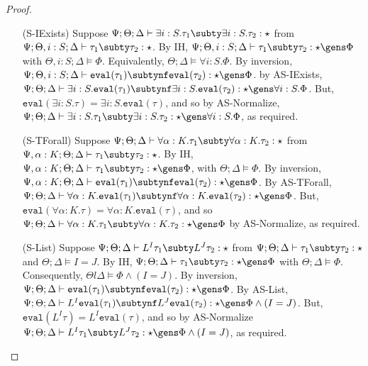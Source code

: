 \begin{proof}
\begin{itemize}
   \item[(S-IExists)] Suppose $\Psi ; \Theta ; \Delta \vdash \exists i : S. \tau_1 \subty \exists i : S. \tau_2 : \star$ from $\Psi ; \Theta, i : S ; \Delta \vdash \tau_1 \subty \tau_2 : \star$. By IH, $\Psi ; \Theta, i : S ; \Delta \vdash \tau_1 \subty \tau_2 : \star \gens \Phi$ with $\Theta, i : S ; \Delta \vDash \Phi$. Equivalently, $\Theta ; \Delta \vDash \forall i : S. \Phi$. By inversion, $\Psi ; \Theta, i : S ; \Delta \vdash \texttt{eval}(\tau_1) \subtynf \texttt{eval}(\tau_2) : \star \gens \Phi$. by AS-IExists, $\Psi ; \Theta ; \Delta \vdash \exists i : S. \texttt{eval}(\tau_1) \subtynf \exists i : S. \texttt{eval}(\tau_2) : \star \gens \forall i : S. \Phi$. But, $\texttt{eval}(\exists i : S. \tau) = \exists i : S.\texttt{eval}(\tau)$, and so by AS-Normalize, $\Psi ; \Theta ; \Delta \vdash \exists i : S. \tau_1 \subty \exists i : S. \tau_2 : \star \gens \forall i : S. \Phi$, as required.
   \item[(S-TForall)] Suppose $\Psi ; \Theta ; \Delta \vdash \forall \alpha : K. \tau_1 \subty \forall \alpha : K. \tau_2 : \star$ from 
   $\Psi, \alpha : K ; \Theta ; \Delta \vdash \tau_1 \subty \tau_2 : \star$. By IH,
   $\Psi, \alpha : K ; \Theta ; \Delta \vdash \tau_1 \subty \tau_2 : \star \gens \Phi$, with $\Theta ; \Delta \vDash \Phi$. By inversion,
   $\Psi, \alpha : K ; \Theta ; \Delta \vdash \texttt{eval}(\tau_1) \subtynf \texttt{eval}(\tau_2) : \star \gens \Phi$. By AS-TForall,
   $\Psi ; \Theta ; \Delta \vdash \forall \alpha : K. \texttt{eval}(\tau_1) \subtynf \forall \alpha : K. \texttt{eval}(\tau_2) : \star \gens \Phi$.
   But, $\texttt{eval}(\forall \alpha : K.\tau) = \forall \alpha : K. \texttt{eval}(\tau)$, and so
   $\Psi ; \Theta ; \Delta \vdash \forall \alpha : K. \tau_1 \subty \forall \alpha : K. \tau_2 : \star \gens \Phi$ by AS-Normalize, as required.
   \item[(S-List)] Suppose $\Psi ; \Theta ; \Delta \vdash L^I \tau_1 \subty L^J \tau_2 : \star$ from
   $\Psi ; \Theta ; \Delta \vdash \tau_1 \subty \tau_2 : \star$ and $\Theta ; \Delta \vDash I = J$.
   By IH, $\Psi ; \Theta ; \Delta \vdash \tau_1 \subty \tau_2 : \star \gens \Phi$ with $\Theta ; \Delta \vDash \Phi$. Consequently, $\Theta l \Delta \vDash \Phi \wedge (I = J)$. By inversion, $\Psi ; \Theta ; \Delta \vdash \texttt{eval}(\tau_1) \subtynf \texttt{eval}(\tau_2) : \star \gens \Phi$. By AS-List,
   $\Psi ; \Theta ; \Delta \vdash L^I\texttt{eval}(\tau_1) \subtynf L^J\texttt{eval}(\tau_2) : \star \gens \Phi \wedge (I = J)$. But, $\texttt{eval}(L^I \tau) = L^I \texttt{eval}(\tau)$, and so by AS-Normalize $\Psi ; \Theta ; \Delta \vdash L^I \tau_1 \subty L^J \tau_2 : \star \gens \Phi \wedge (I = J)$, as required.

\end{itemize}
\end{proof}
